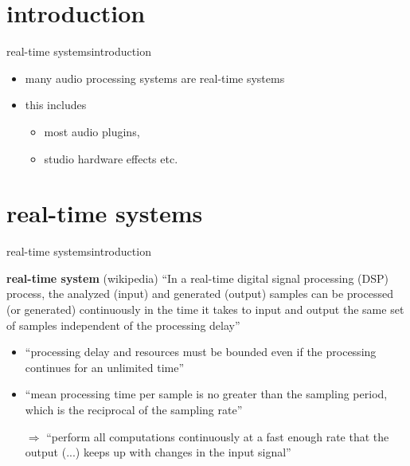 


\subtitle{Part 17: real-time and blocking}


	

\section[intro]{introduction}
	\begin{frame}{real-time systems}{introduction}
        \begin{itemize}
            \item   many audio processing systems are real-time systems
            \item   this includes 
                \begin{itemize}
                    \item   most audio plugins, 
                    \item   studio hardware effects etc.
                \end{itemize}
        \end{itemize}
	\end{frame}

        \section{real-time systems}
	\begin{frame}{real-time systems}{introduction}
		\begin{block}{\textbf{real-time system} (wikipedia)}
            ``In a real-time digital signal processing (DSP) process, the analyzed (input) and generated (output) samples can be processed (or generated) continuously in the time it takes to input and output the same set of samples independent of the processing delay''
			
		\end{block}
        \pause
        \begin{itemize}
            \item   ``processing delay and resources must be bounded even if the processing continues for an unlimited time''
            \pause  
            \item   ``mean processing time per sample is no greater than the sampling period, which is the reciprocal of the sampling rate''
            \pause
            \item[$\Rightarrow$] ``perform all computations continuously at a fast enough rate that the output (...) keeps up with changes in the input signal'' 
        \end{itemize}
        
	\end{frame}

